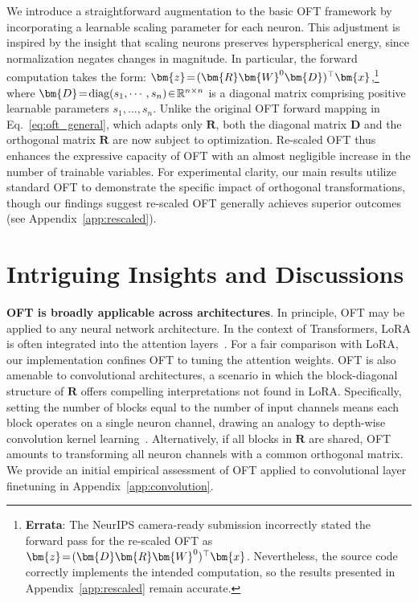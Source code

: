 We introduce a straightforward augmentation to the basic OFT framework by incorporating a learnable scaling parameter for each neuron. This adjustment is inspired by the insight that scaling neurons preserves hyperspherical energy, since normalization negates changes in magnitude. In particular, the forward computation takes the form: $\thickmuskip=2mu \medmuskip=2mu\bm{z}=(\bm{R}\bm{W}^0\bm{D})^\top\bm{x}$,\footnote{\textbf{Errata}: The NeurIPS camera-ready submission incorrectly stated the forward pass for the re-scaled OFT as $\thickmuskip=2mu \medmuskip=2mu\bm{z}=(\bm{D}\bm{R}\bm{W}^0)^\top\bm{x}$. Nevertheless, the source code correctly implements the intended computation, so the results presented in Appendix~\ref{app:rescaled} remain accurate.} where $\thickmuskip=2mu \medmuskip=2mu \bm{D}=\text{diag}(s_1,\cdots,s_n)\in\mathbb{R}^{n\times n}$ is a diagonal matrix comprising positive learnable parameters $s_1,\ldots,s_n$. Unlike the original OFT forward mapping in Eq.~\eqref{eq:oft_general}, which adapts only $\bm{R}$, both the diagonal matrix $\bm{D}$ and the orthogonal matrix $\bm{R}$ are now subject to optimization. Re-scaled OFT thus enhances the expressive capacity of OFT with an almost negligible increase in the number of trainable variables. For experimental clarity, our main results utilize standard OFT to demonstrate the specific impact of orthogonal transformations, though our findings suggest re-scaled OFT generally achieves superior outcomes (see Appendix~\ref{app:rescaled}).

\section{Intriguing Insights and Discussions}

\textbf{OFT is broadly applicable across architectures}. In principle, OFT may be applied to any neural network architecture. In the context of Transformers, LoRA is often integrated into the attention layers~\cite{hulora2022}. For a fair comparison with LoRA, our implementation confines OFT to tuning the attention weights. OFT is also amenable to convolutional architectures, a scenario in which the block-diagonal structure of $\bm{R}$ offers compelling interpretations not found in LoRA. Specifically, setting the number of blocks equal to the number of input channels means each block operates on a single neuron channel, drawing an analogy to depth-wise convolution kernel learning~\cite{chollet2017xception}. Alternatively, if all blocks in $\bm{R}$ are shared, OFT amounts to transforming all neuron channels with a common orthogonal matrix. We provide an initial empirical assessment of OFT applied to convolutional layer finetuning in Appendix~\ref{app:convolution}.

